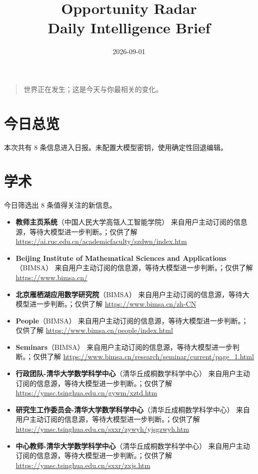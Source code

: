 \documentclass[11pt]{ctexart}
\title{Opportunity Radar\\Daily Intelligence Brief}
\date{2026-09-01}
\begin{document}
\maketitle
\begin{quote}\Large 世界正在发生；这是今天与你最相关的变化。\end{quote}
\section*{今日总览}
本次共有 8 条信息进入日报。未配置大模型密钥，使用确定性回退编辑。
\section*{学术}
今日筛选出 8 条值得关注的新信息。
\begin{itemize}
\item \textbf{教师主页系统}（中国人民大学高瓴人工智能学院） 来自用户主动订阅的信息源，等待大模型进一步判断。；仅供了解 \url{https://ai.ruc.edu.cn/academicfaculty/szdwn/index.htm}
\item \textbf{Beijing Institute of Mathematical Sciences and Applications}（BIMSA） 来自用户主动订阅的信息源，等待大模型进一步判断。；仅供了解 \url{https://www.bimsa.cn/}
\item \textbf{北京雁栖湖应用数学研究院}（BIMSA） 来自用户主动订阅的信息源，等待大模型进一步判断。；仅供了解 \url{https://www.bimsa.cn/zh-CN}
\item \textbf{People}（BIMSA） 来自用户主动订阅的信息源，等待大模型进一步判断。；仅供了解 \url{https://www.bimsa.cn/people/index.html}
\item \textbf{Seminars}（BIMSA） 来自用户主动订阅的信息源，等待大模型进一步判断。；仅供了解 \url{https://www.bimsa.cn/research/seminar/current/page_1.html}
\item \textbf{行政团队-清华大学数学科学中心}（清华丘成桐数学科学中心） 来自用户主动订阅的信息源，等待大模型进一步判断。；仅供了解 \url{https://ymsc.tsinghua.edu.cn/gywm/xztd.htm}
\item \textbf{研究生工作委员会-清华大学数学科学中心}（清华丘成桐数学科学中心） 来自用户主动订阅的信息源，等待大模型进一步判断。；仅供了解 \url{https://ymsc.tsinghua.edu.cn/sxxr/zywyh/yjsgzwyh.htm}
\item \textbf{中心教师-清华大学数学科学中心}（清华丘成桐数学科学中心） 来自用户主动订阅的信息源，等待大模型进一步判断。；仅供了解 \url{https://ymsc.tsinghua.edu.cn/sxxr/zxjs.htm}
\end{itemize}
\end{document}

